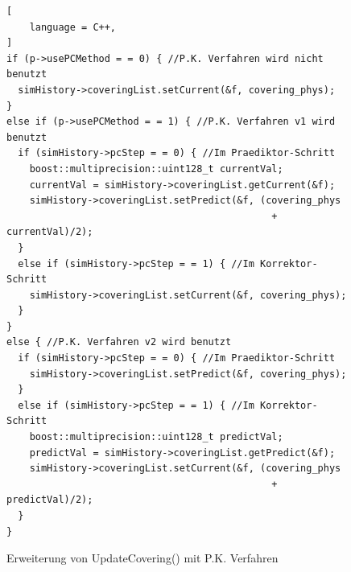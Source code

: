 \documentclass{listhesis}
\begin{document}
\begin{figure}[!h]
\centering
\begin{lstlisting}[
    language = C++,
]
if (p->usePCMethod = = 0) { //P.K. Verfahren wird nicht benutzt
  simHistory->coveringList.setCurrent(&f, covering_phys);
} 
else if (p->usePCMethod = = 1) { //P.K. Verfahren v1 wird benutzt
  if (simHistory->pcStep = = 0) { //Im Praediktor-Schritt
    boost::multiprecision::uint128_t currentVal;
    currentVal = simHistory->coveringList.getCurrent(&f);
    simHistory->coveringList.setPredict(&f, (covering_phys 
                                              + currentVal)/2);
  } 
  else if (simHistory->pcStep = = 1) { //Im Korrektor-Schritt	
    simHistory->coveringList.setCurrent(&f, covering_phys);
  }
}
else { //P.K. Verfahren v2 wird benutzt
  if (simHistory->pcStep = = 0) { //Im Praediktor-Schritt
    simHistory->coveringList.setPredict(&f, covering_phys);
  } 
  else if (simHistory->pcStep = = 1) { //Im Korrektor-Schritt	
    boost::multiprecision::uint128_t predictVal;
    predictVal = simHistory->coveringList.getPredict(&f);
    simHistory->coveringList.setCurrent(&f, (covering_phys 
                                              + predictVal)/2);
  }
}
\end{lstlisting}
\caption{Erweiterung von UpdateCovering() mit P.K. Verfahren}
\label{fig:updateCov}
\end{figure}
\end{document}
